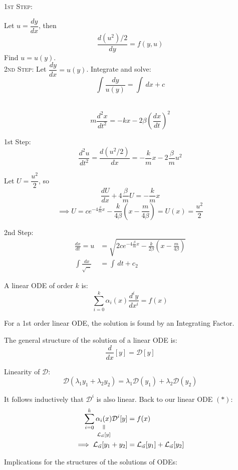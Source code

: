 \documentclass[10pt]{scrartcl}
\begin{document}
\begin{enumerate}[(1)]
\textsc{1st Step:}

Let $u = \dfrac{dy}{dx}$, then 
\[\frac{d(u^2)/2}{dy} = f(y,u)\]
Find $u = u(y)$.\\

\textsc{2nd Step:}
Let $\dfrac{dy}{dx} = u(y)$. Integrate and solve:
\[\int \frac{dy}{u(y)} = \int\,dx + c\]~

\begin{example}[Spring]
	\[m\frac{d^2x}{dt^2} = -kx - 2\beta\left(\frac{dx}{dt}\right)^2\]
	
	1st Step: 
	\[\frac{d^2u}{dt^2} = \frac{d(u^2/2)}{dx} = -\frac{k}{m}x - 2\frac{\beta}{m}u^2\]
	
	Let $U = \dfrac{u^2}{2}$, so 
	\[\frac{dU}{dx} + 4\frac{\beta}{m}U = -\frac{k}{m}x\]
	\[\implies U = ce^{-4\frac{\beta}{m}x} - \frac{k}{4\beta}\left(x - \frac{m}{4\beta}\right) = U(x) = \frac{u^2}{2}\]

	2nd Step: 
	\[
\begin{aligned}
  \frac{dx}{dt} = u &= \sqrt{2ce^{-4\frac{\beta}{m}x} - \frac{k}{2\beta}\left(x-\frac{m}{4\beta}\right)}\\
  \int \frac{dx}{\sqrt{\dots}} &= \int \,dt + c_2
\end{aligned}
\]
\end{example}
\end{enumerate}




A linear ODE of order $k$ is:
\[\sum_{i=0}^k \alpha_i(x) \frac{d^iy}{dx^i} = f(x) \tag{$*$}\]

For a 1st order linear ODE, the solution is found by an Integrating Factor. 

The general structure of the solution of a linear ODE is: 
\[\frac{d}{dx}[y] = \mathcal{D}[y]\]

Linearity of $\mathcal{D}$:
\[\mathcal{D}(\lambda_1y_1 + \lambda_2y_2) = \lambda_1\mathcal{D}(y_1) +\lambda_2\mathcal{D}(y_2)\]

It follows inductively that $\mathcal{D}^i$ is also linear. Back to our linear ODE $(*)$: 
\[
\begin{aligned}
  \sum_{i=0}^k \equalto{\alpha_i(x)}{\mathcal{L}_{\vec{\alpha}}[y]}\mathcal{D}^i[y] &= f(x)\\
  \implies \mathcal{L}_{\vec{\alpha}}[y_1 + y_2] &= \mathcal{L}_{\vec{\alpha}}[y_1] + \mathcal{L}_{\vec{\alpha}}[y_2]
\end{aligned}
\]

Implications for the structures of the solutions of ODEs:
\end{document}
